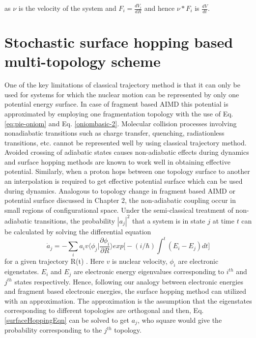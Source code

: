 as $\nu$ is the velocity of the system and $F_{i} = \frac{dV_i}{dR}$ and hence $\nu*F_{i}$ is $\frac{dV}{dt}$.

\section{Stochastic surface hopping based multi-topology scheme}
One of the key limitations of classical trajectory method is that it can only be used for
systems for which the nuclear motion can be represented by only one potential energy
surface. In case of fragment based AIMD this potential is approximated by employing one
fragmentation topology with the use of Eq. \ref{eq:pie-oniom} and Eq. \ref{oniombasic-2}.
Molecular collision processes involving nonadiabatic transitions such as charge transfer,
quenching, radiationless transitions, etc. cannot be represented well by using classical
trajectory method. Avoided crossing of adiabatic states causes non-adiabatic effects
\cite{landau1932theory, zener1932non, stueckelberg1932ecg} during dynamics and surface
hopping methods are known to work well in obtaining effective potential.
Similarly, when a proton hops between one topology surface to another an interpolation is
required to get effective potential surface which can be used during dynamics. Analogous to
topology change in fragment based AIMD or potential surface discussed in Chapter 2, the
non-adiabatic coupling occur in small regions of configurational space. 
Under the semi-classical treatment of non-adiabatic transitions, the probability $|a_{j}|^2$
that a system is in state $j$ at time $t$ can be calculated by solving the differential equation
\begin{equation}
\label{surfaceHoppingEqn}
{\dot a}_{j} = - \sum_{i}^{}a_{i}v \big \langle \phi_{j}|\frac{\partial \phi_{i}}{\partial R}
 \big \rangle exp\bigg[-(i/\hbar)\int_{}^{t} (E_{i}-E_{j})dt  \bigg]
\end{equation}
for a given trajectory R(t) \cite{tully1971trajectory}. Here $v$ is nuclear velocity,
$\phi_{i}$ are electronic eigenstates. $E_{i}$ and $E_{j}$ are electronic energy eigenvalues
corresponding to $i^{th}$ and $j^{th}$ states respectively. Hence, following our analogy
between electronic energies and fragment based electronic energies, the surface hopping method
can utilized with an approximation. The approximation is the assumption that the eigenstates
corresponding to different topologies are orthogonal and then, Eq. \ref{surfaceHoppingEqn}
can be solved to get $a_{j}$, who square would give the probability corresponding to the
$j^{th}$ topology.

